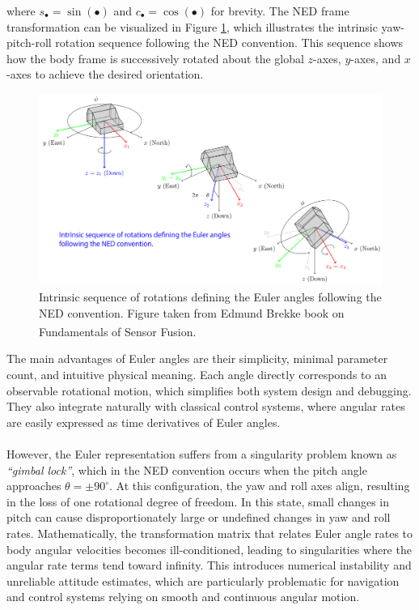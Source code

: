 where $s_\bullet = \sin(\bullet)$ and $c_\bullet = \cos(\bullet)$ for brevity. The NED frame transformation can be visualized in Figure \ref{fig:system-modeling-ned-euler}, which illustrates the intrinsic yaw-pitch-roll rotation sequence following the NED convention. This sequence shows how the body frame is successively rotated about the global $z$-axes, $y$-axes, and $x$-axes to achieve the desired orientation.  
\begin{figure}[H]
    \centering
    \includegraphics[width=0.9\linewidth]{Pictures/System_Modeling/Orientation_Representations/NED_Frame_EUler_Angles.png}
    \caption{Intrinsic sequence of rotations defining the Euler angles following the NED convention. Figure taken from Edmund Brekke book on Fundamentals of Sensor Fusion.\textsuperscript{\cite{sensor_fusion_book}}}
    \label{fig:system-modeling-ned-euler}
\end{figure}
\noindent
The main advantages of Euler angles are their simplicity, minimal parameter count, and intuitive physical meaning. Each angle directly corresponds to an observable rotational motion, which simplifies both system design and debugging. They also integrate naturally with classical control systems, where angular rates are easily expressed as time derivatives of Euler angles.  
\\ \\
However, the Euler representation suffers from a singularity problem known as \textit{``gimbal lock''}, which in the NED convention occurs when the pitch angle approaches $\theta = \pm90^{\circ}$. At this configuration, the yaw and roll axes align, resulting in the loss of one rotational degree of freedom. In this state, small changes in pitch can cause disproportionately large or undefined changes in yaw and roll rates. Mathematically, the transformation matrix that relates Euler angle rates to body angular velocities becomes ill-conditioned, leading to singularities where the angular rate terms tend toward infinity. This introduces numerical instability and unreliable attitude estimates, which are particularly problematic for navigation and control systems relying on smooth and continuous angular motion.
